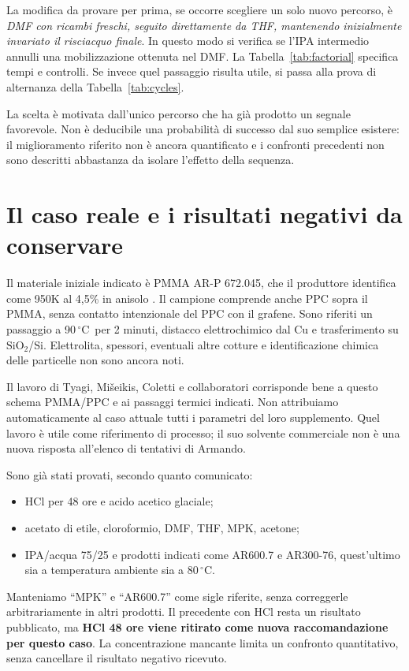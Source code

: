 \documentclass[11pt,reqno]{amsart}
\numberwithin{equation}{section}
\newcommand{\SiO}{\ensuremath{\mathrm{SiO}_2}}
\newcommand{\degC}{\ensuremath{^{\circ}\mathrm{C}}}
\begin{document}
La modifica da provare per prima, se occorre scegliere un solo
nuovo percorso, \`e \emph{DMF con ricambi freschi, seguito direttamente
da THF, mantenendo inizialmente invariato il risciacquo finale}.
In questo modo si verifica se l'IPA intermedio annulli una
mobilizzazione ottenuta nel DMF. La Tabella~\ref{tab:factorial}
specifica tempi e controlli. Se invece quel passaggio risulta utile,
si passa alla prova di alternanza della Tabella~\ref{tab:cycles}.

La scelta \`e motivata dall'unico percorso che ha gi\`a prodotto un
segnale favorevole. Non \`e deducibile una probabilit\`a di successo
dal suo semplice esistere: il miglioramento riferito non \`e ancora
quantificato e i confronti precedenti non sono descritti abbastanza
da isolare l'effetto della sequenza.

\section{Il caso reale e i risultati negativi da conservare}

Il materiale iniziale indicato \`e PMMA AR-P 672.045, che il produttore
identifica come 950K al 4,5\% in anisolo \cite{Allresist}. Il campione
comprende anche PPC sopra il PMMA, senza contatto intenzionale del
PPC con il grafene. Sono riferiti un passaggio a 90\,\degC\ per
2 minuti, distacco elettrochimico dal Cu e trasferimento su \SiO/Si.
Elettrolita, spessori, eventuali altre cotture e identificazione
chimica delle particelle non sono ancora noti.

Il lavoro di Tyagi, Mi\v{s}eikis, Coletti e collaboratori
\cite{Tyagi2022} corrisponde bene a questo schema PMMA/PPC e ai
passaggi termici indicati. Non attribuiamo automaticamente al caso
attuale tutti i parametri del loro supplemento. Quel lavoro \`e
utile come riferimento di processo; il suo solvente commerciale
non \`e una nuova risposta all'elenco di tentativi di Armando.

Sono gi\`a stati provati, secondo quanto comunicato:
\begin{itemize}
\item HCl per 48 ore e acido acetico glaciale;
\item acetato di etile, cloroformio, DMF, THF, MPK, acetone;
\item IPA/acqua 75/25 e prodotti indicati come AR600.7 e AR300-76,
quest'ultimo sia a temperatura ambiente sia a 80\,\degC.
\end{itemize}
Manteniamo ``MPK'' e ``AR600.7'' come sigle riferite, senza
correggerle arbitrariamente in altri prodotti. Il precedente con
HCl \cite{Xiao2019} resta un risultato pubblicato, ma \textbf{HCl
48 ore viene ritirato come nuova raccomandazione per questo caso}.
La concentrazione mancante limita un confronto quantitativo, senza
cancellare il risultato negativo ricevuto.
\end{document}
